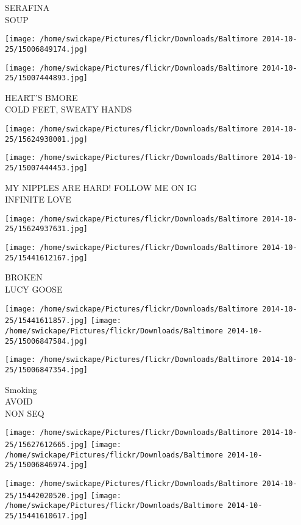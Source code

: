 \documentclass[10pt,letterpaper]{article}
\begin{document}
SERAFINA\\
SOUP
\pagebreak

\texttt{[image: /home/swickape/Pictures/flickr/Downloads/Baltimore 2014-10-25/15006849174.jpg]}

\vspace{0.25in}
\texttt{[image: /home/swickape/Pictures/flickr/Downloads/Baltimore 2014-10-25/15007444893.jpg]}

HEART'S BMORE\\
COLD FEET, SWEATY HANDS
\pagebreak

\texttt{[image: /home/swickape/Pictures/flickr/Downloads/Baltimore 2014-10-25/15624938001.jpg]}

\vspace{0.25in}
\texttt{[image: /home/swickape/Pictures/flickr/Downloads/Baltimore 2014-10-25/15007444453.jpg]}

MY NIPPLES ARE HARD!  FOLLOW ME ON IG\\
INFINITE LOVE
\pagebreak

\texttt{[image: /home/swickape/Pictures/flickr/Downloads/Baltimore 2014-10-25/15624937631.jpg]}

\vspace{0.25in}
\texttt{[image: /home/swickape/Pictures/flickr/Downloads/Baltimore 2014-10-25/15441612167.jpg]}

BROKEN\\
LUCY GOOSE
\pagebreak

\texttt{[image: /home/swickape/Pictures/flickr/Downloads/Baltimore 2014-10-25/15441611857.jpg]}
\texttt{[image: /home/swickape/Pictures/flickr/Downloads/Baltimore 2014-10-25/15006847584.jpg]}

\vspace{0.25in}
\texttt{[image: /home/swickape/Pictures/flickr/Downloads/Baltimore 2014-10-25/15006847354.jpg]}

Smoking\\
AVOID\\
NON SEQ
\pagebreak

\texttt{[image: /home/swickape/Pictures/flickr/Downloads/Baltimore 2014-10-25/15627612665.jpg]}
\texttt{[image: /home/swickape/Pictures/flickr/Downloads/Baltimore 2014-10-25/15006846974.jpg]}

\texttt{[image: /home/swickape/Pictures/flickr/Downloads/Baltimore 2014-10-25/15442020520.jpg]}
\texttt{[image: /home/swickape/Pictures/flickr/Downloads/Baltimore 2014-10-25/15441610617.jpg]}
\end{document}
